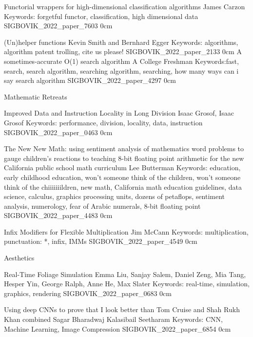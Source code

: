 \addpaper
    {Functorial wrappers for high-dimensional classification algorithms}
    {James Carzon}
    {Keywords: forgetful functor, classification, high dimensional data}
    {SIGBOVIK_2022_paper_7603}
    {0cm}
    {}

\addpaper
    {(Un)helper functions}
    {Kevin Smith and Bernhard Egger}
    {Keywords: algorithms, algorithm patent trolling, cite us please!}
    {SIGBOVIK_2022_paper_2133}
    {0cm}
    {}
\addpaper
    {A sometimes-accurate O(1) search algorithm}
    {A College Freshman}
    {Keywords:fast, search, search algorithm, searching algorithm, searching, how many ways can i say search algorithm}
    {SIGBOVIK_2022_paper_4297}
    {0cm}
    {}

\addtrack
    {}{Mathematic Retreats}

\addpaper
    {Improved Data and Instruction Locality in Long Division}
    {Isaac Grosof, Isaac Grosof}
    {Keywords: performance, division, locality, data, instruction}
    {SIGBOVIK_2022_paper_0463}
    {0cm}
    {}

\addpaper
    {The New New Math: using sentiment analysis of mathematics word problems to gauge children's reactions to teaching 8-bit floating point arithmetic for the new California public school math curriculum}
    {Lee Butterman}
    {Keywords: education, early childhood education, won't someone think of the children, won't someone think of the chiiiiiiildren, new math, California math education guidelines, data science, calculus, graphics processing units, dozens of petaflops, sentiment analysis, numerology, fear of Arabic numerals, 8-bit floating point}
    {SIGBOVIK_2022_paper_4483}
    {0cm}
    {}

\addpaper
    {Infix Modifiers for Flexible Multiplication}
    {Jim McCann}
    {Keywords: multiplication, punctuation: *, infix, IMMs}
    {SIGBOVIK_2022_paper_4549}
    {0cm}
    {}

\addtrack
    {}{Aesthetics}

\addpaper
    {Real-Time Foliage Simulation}
    {Emma Liu, Sanjay Salem, Daniel Zeng, Mia Tang, Hesper Yin, George Ralph, Anne He, Max Slater}
    {Keywords: real-time, simulation, graphics, rendering}
    {SIGBOVIK_2022_paper_0683}
    {0cm}
    {}

\addpaper
    {Using deep CNNs to prove that I look better than Tom Cruise and Shah Rukh Khan combined}
    {Sagar Bharadwaj Kalasibail Seetharam}
    {Keywords: CNN, Machine Learning, Image Compression}
    {SIGBOVIK_2022_paper_6854}
    {0cm}
    {}

